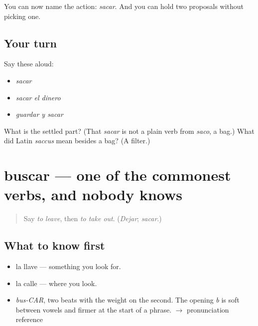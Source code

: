 \begin{grammarlens}[title={What you've built}]
You can now name the action: \emph{sacar}. And you can hold two proposals without picking one.
\end{grammarlens}

\subsection*{Your turn}
Say these aloud:

\begin{itemize}
\raggedright
  \item \emph{sacar}
  \item \emph{sacar el dinero}
  \item \emph{guardar y sacar}
\end{itemize}

\begin{tcolorbox}[breakable,colback=teal!4,colframe=teal!35!black,title={Before you move on}]
What is the settled part? (That \emph{sacar} is not a plain verb from \emph{saco}, a bag.) What did Latin \emph{saccus} mean besides a bag? (A filter.)
\end{tcolorbox}
\section[buscar]{buscar — one of the commonest verbs, and nobody knows}

\label{lesson:ES-C383-buscar}



\begin{quote}
Say \emph{to leave}, then \emph{to take out}. (\emph{Dejar}; \emph{sacar}.)
\end{quote}

\subsection*{What to know first}
\begin{itemize}
\raggedright
  \item la llave — something you look for.
  \item la calle — where you look.
\end{itemize}

\begin{sounds}
\begin{itemize}
\raggedright
  \item \emph{bus-CAR}, two beats with the weight on the second. The opening \emph{b} is soft between vowels and firmer at the start of a phrase. $\to$ pronunciation reference
\end{itemize}
\end{sounds}

